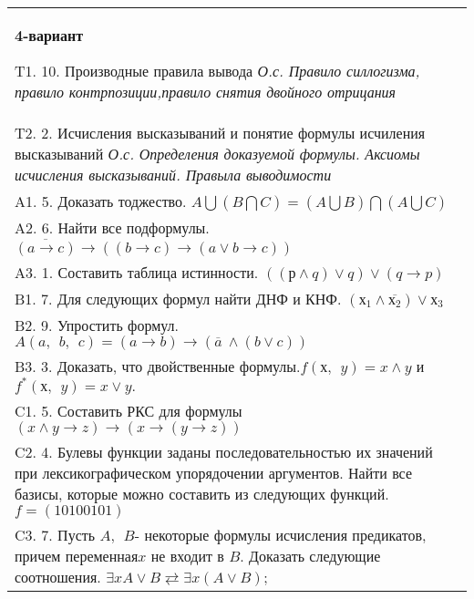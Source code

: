 \documentclass{article}
\begin{document}
\begin{tabular}{m{17cm}}
\textbf{4-вариант}
\newline

T1. 10. Производные правила вывода \emph{О.с. Правило силлогизма, правило контрпозиции,правило снятия двойного отрицания} \\
T2. 2. Исчисления высказываний и понятие формулы исчиления высказываний \emph{О.с. Определения доказуемой формулы. Аксиомы исчисления высказываний. Правыла выводимости} \\
A1. 5. Доказать тоджество. \(A\bigcup(B\bigcap C) = (A\bigcup B)\bigcap(A\bigcup C)\) \\
A2. 6. Найти все подформулы. \(\overline{(a \rightarrow c)} \rightarrow \left( (b \rightarrow c) \rightarrow (a \vee b \rightarrow c) \right)\) \\
A3. 1. Составить таблица истинности. \(\left( (р \land q) \vee q \right) \vee (q \rightarrow p)\) \\
B1. 7. Для следующих формул найти ДНФ и КНФ. \(\left( х_{1} \land \overline{х_{2}} \right) \vee х_{3}\) \\
B2. 9. Упростить формул. \(A(a,\ \ b,\ \ c) = (a \rightarrow b) \rightarrow (\overline{a}\  \land (b \vee c))\) \\
B3. 3. Доказать, что двойственные формулы.\(f(х,\ \ y) = x \land y\) и \(f^{*}(х,\ \ y) = x \vee y.\) \\
C1. 5. Составить РКС для формулы \((x \land y \rightarrow z) \rightarrow (x \rightarrow (y \rightarrow z))\) \\
C2. 4. Булевы функции заданы последовательностью их значений при лексикографическом упорядочении аргументов. Найти все базисы, которые можно составить из следующих функций. \(f = (10100101)\) \\
C3. 7. Пусть \(A,\ \ B\)- некоторые формулы исчисления предикатов, причем переменная\(x\) не входит в \(B\). Доказать следующие соотношения. \(\exists xA \vee B \rightleftarrows \exists x(A \vee B)\); \\

\end{tabular}
\vspace{1cm}
\end{document}
